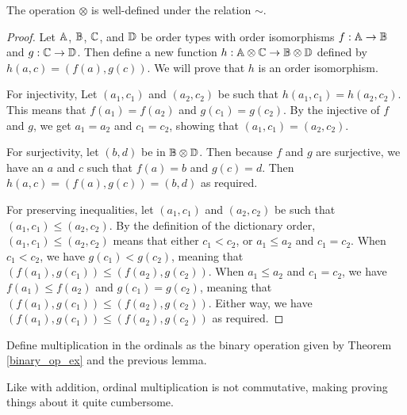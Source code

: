 \documentclass[../../math.tex]{subfiles}
\begin{document}
\begin{lemma}
    The operation $\otimes$ is well-defined under the relation $\sim$.
\end{lemma}
\begin{proof}
    Let $\mathbb{A}$, $\mathbb{B}$, $\mathbb{C}$, and $\mathbb{D}$ be order types with order isomorphisms $f :
    \mathbb{A} \to \mathbb{B}$ and $g : \mathbb{C} \to \mathbb{D}$.  Then define a new function $h : \mathbb{A} \otimes
    \mathbb{C} \to \mathbb{B} \otimes \mathbb{D}$ defined by $h(a, c) = (f(a), g(c))$.  We will prove
    that $h$ is an order isomorphism.

    For injectivity, Let $(a_1, c_1)$ and $(a_2, c_2)$ be such that $h(a_1, c_1)
    = h(a_2, c_2)$.  This means that $f(a_1) = f(a_2)$ and $g(c_1) = g(c_2)$.
    By the injective of $f$ and $g$, we get $a_1 = a_2$ and $c_1 = c_2$, showing
    that $(a_1, c_1) = (a_2, c_2)$.

    For surjectivity, let $(b, d)$ be in $\mathbb{B} \otimes \mathbb{D}$.  Then because $f$ and
    $g$ are surjective, we have an $a$ and $c$ such that $f(a) = b$ and $g(c) =
    d$.  Then $h(a, c) = (f(a), g(c)) = (b, d)$ as required.

    For preserving inequalities, let $(a_1, c_1)$ and $(a_2, c_2)$ be such that
    $(a_1, c_1) \leq (a_2, c_2)$.  By the definition of the dictionary order,
    $(a_1, c_1) \leq (a_2, c_2)$ means that either $c_1 < c_2$, or $a_1 \leq a_2$
    and $c_1 = c_2$.  When $c_1 < c_2$, we have $g(c_1) < g(c_2)$, meaning that
    $(f(a_1), g(c_1)) \leq (f(a_2), g(c_2))$.  When $a_1 \leq a_2$ and $c_1 =
    c_2$, we have $f(a_1) \leq f(a_2)$ and $g(c_1) = g(c_2)$, meaning that
    $(f(a_1), g(c_1)) \leq (f(a_2), g(c_2))$.  Either way, we have $(f(a_1),
    g(c_1)) \leq (f(a_2), g(c_2))$ as required.
\end{proof}

\begin{instance}
    Define multiplication in the ordinals as the binary operation given by
    Theorem \ref{binary_op_ex} and the previous lemma.
\end{instance}

Like with addition, ordinal multiplication is not commutative, making proving
things about it quite cumbersome.
\end{document}
